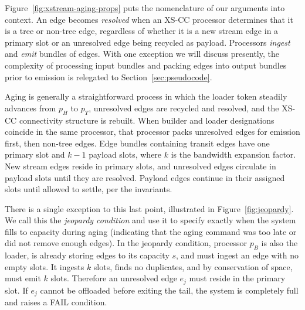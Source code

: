 

Figure~\ref{fig:xstream-aging-props} puts the
nomenclature of our arguments into context. An edge becomes \emph{resolved}
when an XS-CC processor determines that it is a tree or non-tree edge,
regardless of whether it is a new stream edge in a primary slot or an
unresolved edge being recycled as payload.  Processors \emph{ingest} and
\emph{emit} bundles of edges.  With one exception we will discuss presently,
the complexity of processing input bundles and packing edges into
output bundles prior to emission is relegated to Section~\ref{sec:pseudocode}.

Aging is generally a straightforward process in which the loader token
steadily advances from $p_H$ to $p_T$, unresolved edges are recycled and
resolved, and the XS-CC connectivity structure is rebuilt.  
When builder and loader designations coincide in the same processor, 
that processor packs unresolved edges for emission first, then non-tree 
edges.  Edge bundles containing transit edges have one primary slot and $k-1$ 
payload slots, where
$k$ is the bandwidth expansion factor.  New stream edges reside in primary
slots, and unresolved edges circulate in payload slots until they are
resolved.  Payload edges continue in their assigned slots until allowed to 
settle, per the invariants.

There is a single exception to this last point, illustrated in
Figure~\ref{fig:jeopardy}. We call this the \emph{jeopardy condition}
and use it to specify exactly when the system fills
to capacity during aging (indicating that the aging command was too late
or did not remove enough edges).
In the jeopardy condition, processor $p_B$ is also the loader,
is already storing edges to its capacity $s$, and must ingest an edge \bundle
with no empty slots. It ingests $k$ slots, finds no duplicates,
and by conservation of space, must emit $k$ slots. 
Therefore an unresolved edge $e_j$ must reside in the primary slot.
If $e_j$ cannot be offloaded before exiting the tail,
the system is completely full and raises a FAIL condition.

